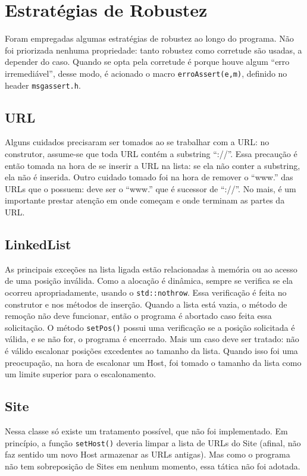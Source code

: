 \documentclass{article}
\def\code#1{\texttt{#1}}
\begin{document}
\section{Estratégias de Robustez}

Foram empregadas algumas estratégias de robustez ao longo do programa. Não foi priorizada nenhuma propriedade: tanto robustez como corretude são usadas, a depender do caso. Quando se opta pela corretude é porque houve algum ``erro irremediável'', desse modo, é acionado o macro \code{erroAssert(e,m)}, definido no header \code{msgassert.h}.

\subsection{URL}

Alguns cuidados precisaram ser tomados ao se trabalhar com a URL: no construtor, assume-se que toda URL contém a substring ``://''. Essa precaução é então tomada na hora de se inserir a URL na lista: se ela não conter a substring, ela não é inserida. Outro cuidado tomado foi na hora de remover o ``www.'' das URLs que o possuem: deve ser o ``www.'' que é sucessor de ``://''. No mais, é um importante prestar atenção em onde começam e onde terminam as partes da URL.

\subsection{LinkedList}

As principais exceções na lista ligada estão relacionadas à memória ou ao acesso de uma posição inválida. Como a alocação é dinâmica, sempre se verifica se ela ocorreu apropriadamente, usando o \code{std::nothrow}. Essa verificação é feita no construtor e nos métodos de inserção. Quando a lista está vazia, o método de remoção não deve funcionar, então o programa é abortado caso feita essa solicitação. O método \code{setPos()} possui uma verificação se a posição solicitada é válida, e se não for, o programa é encerrado. Mais um caso deve ser tratado: não é válido escalonar posições excedentes ao tamanho da lista. Quando isso foi uma preocupação, na hora de escalonar um Host, foi tomado o tamanho da lista como um limite superior para o escalonamento.

\subsection{Site}

Nessa classe só existe um tratamento possível, que não foi implementado. Em princípio, a função \code{setHost()} deveria limpar a lista de URLs do Site (afinal, não faz sentido um novo Host armazenar as URLs antigas). Mas como o programa não tem sobreposição de Sites em nenhum momento, essa tática não foi adotada.
\end{document}
